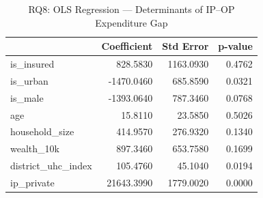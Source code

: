 \begin{table}
\caption{RQ8: OLS Regression — Determinants of IP--OP Expenditure Gap}
\label{tab:rq8_gap}
\begin{tabular}{lrrr}
\toprule
 & Coefficient & Std Error & p-value \\
\midrule
is_insured & 828.5830 & 1163.0930 & 0.4762 \\
is_urban & -1470.0460 & 685.8590 & 0.0321 \\
is_male & -1393.0640 & 787.3460 & 0.0768 \\
age & 15.8110 & 23.5850 & 0.5026 \\
household_size & 414.9570 & 276.9320 & 0.1340 \\
wealth_10k & 897.3460 & 653.7580 & 0.1699 \\
district_uhc_index & 105.4760 & 45.1040 & 0.0194 \\
ip_private & 21643.3990 & 1779.0020 & 0.0000 \\
\bottomrule
\end{tabular}
\end{table}
